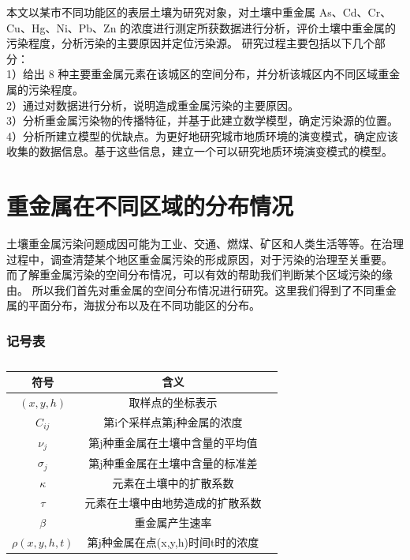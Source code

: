 \documentclass[a4paper]{article}
\begin{document}
\indent 本文以某市不同功能区的表层土壤为研究对象，对土壤中重金属 As、Cd、Cr、
Cu、Hg、Ni、Pb、Zn 的浓度进行测定所获数据进行分析，评价土壤中重金属的污染程度，分析污染的主要原因并定位污染源。
研究过程主要包括以下几个部分：\\
1）给出 8 种主要重金属元素在该城区的空间分布，并分析该城区内不同区域重金属的污染程度。\\
2）通过对数据进行分析，说明造成重金属污染的主要原因。  \\
3）分析重金属污染物的传播特征，并基于此建立数学模型，确定污染源的位置。  \\
4）分析所建立模型的优缺点。为更好地研究城市地质环境的演变模式，确定应该收集的数据信息。基于这些信息，建立一个可以研究地质环境演变模式的模型。  \\

\part{重金属在不同区域的分布情况}
\indent 土壤重金属污染问题成因可能为工业、交通、燃煤、矿区和人类生活等等。在治理过程中，调查清楚某个地区重金属污染的形成原因，对于污染的治理至关重要。
而了解重金属污染的空间分布情况，可以有效的帮助我们判断某个区域污染的缘由。
所以我们首先对重金属的空间分布情况进行研究。这里我们得到了不同重金属的平面分布，海拔分布以及在不同功能区的分布。   \\
\section*{记号表}
\begin{table}[H]
	\centering
	\caption{}
	\label{tab:problem1_symbols}
	\begin{tabular}{ccc}
		\hline
		符号 & 含义  \\
		\hline
		$(x,y,h)$ &取样点的坐标表示   \\
		$C_{ij}$ & 第i个采样点第j种金属的浓度  \\
		$\nu_j$   &  第j种重金属在土壤中含量的平均值  \\
		$\sigma_j$  &   第j种重金属在土壤中含量的标准差 \\
         $\kappa$ & 元素在土壤中的扩散系数      \\
		$\tau$   & 元素在土壤中由地势造成的扩散系数      \\
		$\beta$   &  重金属产生速率            \\
		$\rho(x,y,h,t)$   & 第j种金属在点(x,y,h)时间t时的浓度 \\	
	\end{tabular} \\
\end{table}
\end{document}
